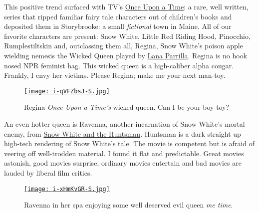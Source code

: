 This positive trend surfaced with TV's
\href{http://www.imdb.com/title/tt1843230/}{Once Upon a Time}: a rare,
well written, series that ripped familiar fairy tale characters out of
children's books and deposited them in Storybrooke: a small
\emph{fictional} town in Maine. All of our favorite characters are
present: Snow White, Little Red Riding Hood, Pinocchio, Rumplestiltskin
and, outclassing them all, Regina, Snow White's poison apple wielding
nemesis the Wicked Queen played by
\href{http://www.imdb.com/name/nm0663469/}{Lana Parrilla}. Regina is no
hook nosed NPR feminist hag. This wicked queen is a high-caliber alpha
cougar. Frankly, I envy her victims. Please Regina; make me your next
man-toy.

\captionsetup[figure]{labelformat=empty}
\begin{SCfigure}[1.5][!h]
\centering
\href{http://beta.abc.go.com/shows/once-upon-a-time}{\texttt{[image: i-qVFZbsJ-S.jpg]}}
\caption{Regina \emph{Once Upon a Time's} wicked queen. Can I be your boy toy?}
\label{fig:2887X0}
\end{SCfigure}

An even hotter queen is Ravenna, another incarnation of Snow White's
mortal enemy, from
\href{http://www.rottentomatoes.com/m/snow\_white\_and\_the\_huntsman/}{Snow
White and the Huntsman}. Huntsman is a dark straight up high-tech
rendering of Snow White's tale. The movie is competent but is afraid of
veering off well-trodden material. I found it flat and predictable.
Great movies astonish, good movies surprise, ordinary movies entertain
and bad movies are lauded by liberal film critics.


%

\captionsetup[figure]{labelformat=empty}
\begin{SCfigure}[1.5][!h]
\centering
\href{http://www.snowwhiteandthehuntsman.com/}{\texttt{[image: i-xHmKvGR-S.jpg]}}
\caption{Ravenna in her spa enjoying some well deserved evil queen \emph{me time}.}
\label{fig:2887X1}
\end{SCfigure}

